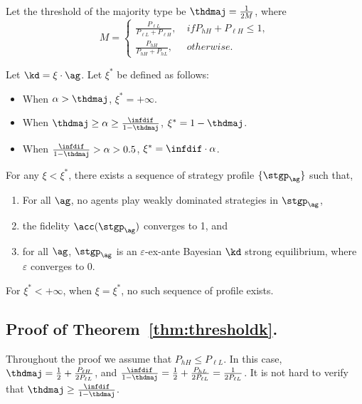 Let the threshold of the majority type be $\thdmaj = \frac{1}{2M}$, where 
\begin{equation*}
    M = 
    \begin{cases}
        \frac{P_{\ell L}}{P_{\ell L} + P_{\ell H}}, &\ if P_{hH} +P_{\ell H} \le 1,\\
        \frac{P_{hH}}{P_{hH} + P_{hL}}, &\ otherwise.
    \end{cases}
\end{equation*}


\begin{theorem}
\label{thm:thresholdk}
Let $\kd = \xi\cdot \ag$. Let $\xi^*$ be defined as follows: 
\begin{itemize}
    \item When $\alpha > \thdmaj$, $\xi^* = +\infty$.
    \item When $\thdmaj \ge \alpha \ge \frac{\infdif}{1 - \thdmaj}$, $\xi^* = 1 - \thdmaj$.
    \item When $\frac{\infdif}{1 - \thdmaj} > \alpha > 0.5$, $\xi^* = \infdif\cdot \alpha$. 
\end{itemize}

For any $\xi < \xi^*$, there exists a sequence of strategy profile $\{\stgp_\ag\}$ such that,
    \begin{enumerate}
        \item For all $\ag$, no agents play weakly dominated strategies in $\stgp_\ag$,
        \item the fidelity $\acc(\stgp_\ag)$ converges to 1, and
        \item for all $\ag$, $\stgp_\ag$ is an $\varepsilon$-ex-ante Bayesian $\kd$ strong equilibrium, where $\varepsilon$ converges to 0.
    \end{enumerate}
    For $\xi^* < + \infty$, when $\xi = \xi^*$, no such sequence of profile exists. 
\end{theorem}

\subsection{Proof of Theorem~\ref{thm:thresholdk}.}

Throughout the proof we assume that $P_{hH} \le P_{\ell L}$. In this case, $\thdmaj = \frac12 + \frac{P_{\ell H}}{2P_{\ell L}}$, and $\frac{\infdif}{1 - \thdmaj} = \frac12 + \frac{P_{hL}}{2P_{\ell L}} = \frac{1}{2P_{\ell L}}$. It is not hard to verify that $\thdmaj \ge \frac{\infdif}{1 - \thdmaj}$. 


